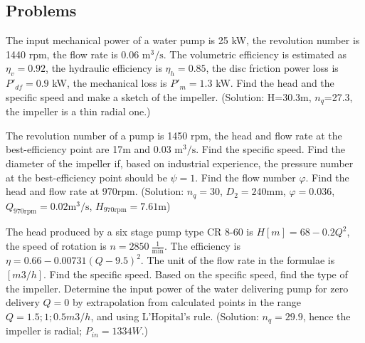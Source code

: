 \subsection{Problems}


The input mechanical power of a water pump is 25 kW, the revolution number is 1440 rpm, the flow rate is 0.06 $\mathrm{m^3/s}$. The volumetric efficiency is estimated as $\eta_v=0.92$, the hydraulic efficiency is $\eta_h=0.85$, the disc friction power loss is $P'_{df}=0.9$ kW, the mechanical loss is $P'_m=1.3$ kW. Find the head and the specific speed and make a sketch of the impeller. (Solution: H=30.3m, $n_q$=27.3, the impeller is a thin radial one.)


\vspace{1cm}

The revolution number of a pump is 1450 rpm, the head and flow rate at the best-efficiency point are 17m and 0.03 $\mathrm{m^3/s}$. Find the specific speed. Find the diameter of the impeller if, based on industrial experience, the pressure number at the best-efficiency point should be $\psi=1$. Find the flow number $\varphi$. Find the head and flow rate at 970rpm. (Solution: $n_q=30$, $D_2=240$mm, $\varphi=0.036$, $Q_{970\mathrm{rpm}}=0.02\mathrm{m^3/s}$, $H_{970\mathrm{rpm}}=7.61\mathrm{m}$) 


\vspace{1cm}

The head produced by a six stage pump type CR 8-60 is $H[m] = 68-0.2Q^2$, the speed of rotation is $n=2850~\frac{1}{\mathrm{min}}$. The efficiency is $\eta = 0.66-0.00731 (Q-9.5)^2$. The unit of the flow rate in the formulae is $[m3/h]$. Find the specific speed. Based on the specific speed, find the type of the impeller. Determine the input power of the water delivering pump for zero delivery $Q=0$ by extrapolation from calculated points in the range $Q = 1.5; 1; 0.5 m3/h$, and using L'Hopital's rule. (Solution: $n_q=29.9$, hence the impeller is radial; $P_{in}=1334W$.)


